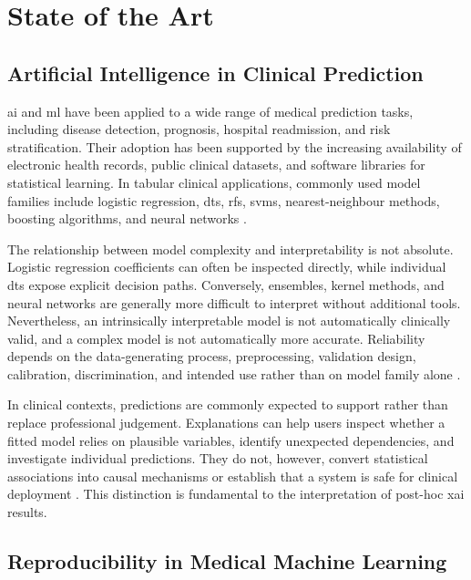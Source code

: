 \chapter{State of the Art}
\label{chap:state_of_art}

\section{Artificial Intelligence in Clinical Prediction}

\Gls{ai} and \gls{ml} have been applied to a wide range of medical prediction tasks, including disease detection, prognosis, hospital readmission, and risk stratification. Their adoption has been supported by the increasing availability of electronic health records, public clinical datasets, and software libraries for statistical learning. In tabular clinical applications, commonly used model families include logistic regression, \glspl{dt}, \glspl{rf}, \glspl{svm}, nearest-neighbour methods, boosting algorithms, and neural networks \citep{ahmed_artificial_2022, bharati_review_2024}.

The relationship between model complexity and interpretability is not absolute. Logistic regression coefficients can often be inspected directly, while individual \glspl{dt} expose explicit decision paths. Conversely, ensembles, kernel methods, and neural networks are generally more difficult to interpret without additional tools. Nevertheless, an intrinsically interpretable model is not automatically clinically valid, and a complex model is not automatically more accurate. Reliability depends on the data-generating process, preprocessing, validation design, \gls{calibration}, discrimination, and intended use rather than on model family alone \citep{barredo_arrieta_explainable_2020}.

In clinical contexts, predictions are commonly expected to support rather than replace professional judgement. Explanations can help users inspect whether a fitted model relies on plausible variables, identify unexpected dependencies, and investigate individual predictions. They do not, however, convert statistical associations into causal mechanisms or establish that a system is safe for clinical deployment \citep{tjoa_survey_2021, yang_unbox_2021}. This distinction is fundamental to the interpretation of post-hoc \gls{xai} results.

\section{Reproducibility in Medical Machine Learning}

